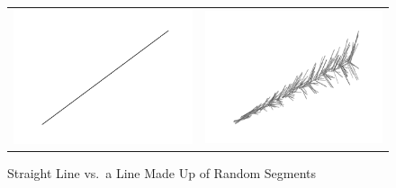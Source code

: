 \begin{figure}
\begin{center}
\begin{tabular}{ll}
\includegraphics[scale=0.3]{images/straight-line.png} &
\includegraphics[scale=0.3]{images/random-line-art.png} \\
\end{tabular}
\end{center}
\caption{Straight Line vs.~a Line Made Up of Random Segments}
\label{fig:line-art}
\end{figure}

